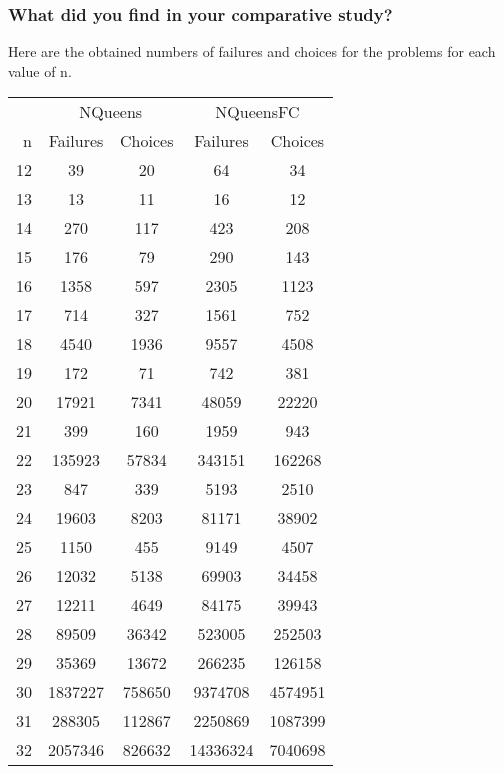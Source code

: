 \documentclass{eplDoc}
\begin{document}
\subsubsection{What did you find in your comparative study?}
Here are the obtained numbers of failures and choices for the problems for each value of n. 
\begin{center}
\begin{tabular}{|r|cc|cc|}
\hline
 & \multicolumn{2}{c}{NQueens} & \multicolumn{2}{|c|}{NQueensFC} \\
 n & Failures & Choices & Failures & Choices \\ 
\hline
12 & 39 & 20 &               64 & 34 \\ 
13 & 13 & 11 &               16 & 12 \\ 
14 & 270 & 117 &             423 & 208 \\ 
15 & 176 & 79 &              290 & 143 \\ 
16 & 1358 & 597 &            2305 & 1123 \\ 
17 & 714 & 327 &             1561 & 752 \\ 
18 & 4540 & 1936 &           9557 & 4508 \\ 
19 & 172 & 71 &              742 & 381 \\ 
20 & 17921 & 7341 &          48059 & 22220 \\ 
21 & 399 & 160 &             1959 & 943 \\ 
22 & 135923 & 57834 &        343151 & 162268 \\ 
23 & 847 & 339 &             5193 & 2510 \\ 
24 & 19603 & 8203 &          81171 & 38902 \\ 
25 & 1150 & 455 &            9149 & 4507 \\ 
26 & 12032 & 5138 &          69903 & 34458 \\ 
27 & 12211 & 4649 &          84175 & 39943 \\ 
28 & 89509 & 36342 &         523005 & 252503 \\ 
29 & 35369 & 13672 &         266235 & 126158 \\ 
30 & 1837227 & 758650 &      9374708 & 4574951 \\ 
31 & 288305 & 112867 &       2250869 & 1087399 \\ 
32 & 2057346 & 826632 &      14336324 & 7040698 \\ 
\hline
\end{tabular}
\end{center}
\end{document}
